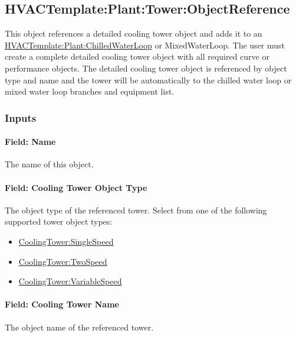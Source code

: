 \subsection{HVACTemplate:Plant:Tower:ObjectReference}\label{hvactemplateplanttowerobjectreference}

This object references a detailed cooling tower object and adds it to an \hyperref[hvactemplateplantchilledwaterloop]{HVACTemplate:Plant:ChilledWaterLoop} or MixedWaterLoop. The user must create a complete detailed cooling tower object with all required curve or performance objects. The detailed cooling tower object is referenced by object type and name and the tower will be automatically to the chilled water loop or mixed water loop branches and equipment list.

\subsubsection{Inputs}\label{inputs-27-000}

\paragraph{Field: Name}\label{field-name-14-003}

The name of this object.

\paragraph{Field: Cooling Tower Object Type}\label{field-cooling-tower-object-type}

The object type of the referenced tower. Select from one of the following supported tower object types:

\begin{itemize}
\item
  \hyperref[coolingtowersinglespeed]{CoolingTower:SingleSpeed}
\item
  \hyperref[coolingtowertwospeed]{CoolingTower:TwoSpeed}
\item
  \hyperref[coolingtowervariablespeed]{CoolingTower:VariableSpeed}
\end{itemize}

\paragraph{Field: Cooling Tower Name}\label{field-cooling-tower-name}

The object name of the referenced tower.

